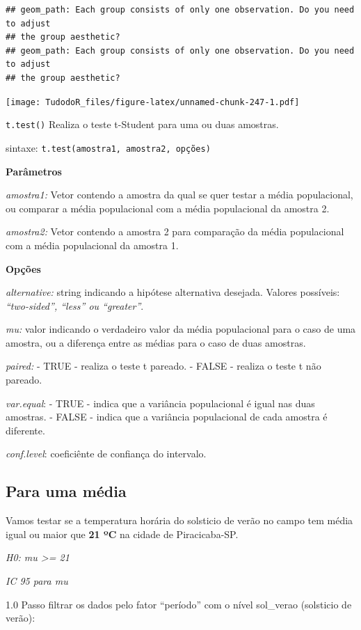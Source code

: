 \documentclass[
]{book}
\begin{document}
\begin{verbatim}
## geom_path: Each group consists of only one observation. Do you need to adjust
## the group aesthetic?
## geom_path: Each group consists of only one observation. Do you need to adjust
## the group aesthetic?
\end{verbatim}

\texttt{[image: TudodoR\_files/figure-latex/unnamed-chunk-247-1.pdf]}

\texttt{t.test()}
Realiza o teste t-Student para uma ou duas amostras.

sintaxe:
\texttt{t.test(amostra1,\ amostra2,\ opções)}

\textbf{Parâmetros}

\emph{amostra1:} Vetor contendo a amostra da qual se quer testar a média populacional, ou comparar a média populacional com a média populacional da amostra 2.

\emph{amostra2:} Vetor contendo a amostra 2 para comparação da média populacional com a média populacional da amostra 1.

\textbf{Opções}

\emph{alternative:} string indicando a hipótese alternativa desejada.
Valores possíveis: \emph{``two-sided'', ``less'' ou ``greater''}.

\emph{mu:} valor indicando o verdadeiro valor da média populacional para o caso de uma amostra, ou a diferença entre as médias para o caso de duas amostras.

\emph{paired:}
- TRUE - realiza o teste t pareado.
- FALSE - realiza o teste t não pareado.

\emph{var.equal}:
- TRUE - indica que a variância populacional é igual nas duas amostras.
- FALSE - indica que a variância populacional de cada amostra é diferente.

\emph{conf.level}: coeficiênte de confiança do intervalo.

\hypertarget{para-uma-muxe9dia}{%
\subsection{Para uma média}\label{para-uma-muxe9dia}}

Vamos testar se a temperatura horária do solsticio de verão no campo tem média igual ou maior que \textbf{21 ºC} na cidade de Piracicaba-SP.

\emph{H0: mu \textgreater= 21}

\emph{IC 95 para mu}

1.0 Passo filtrar os dados pelo fator ``período'' com o nível sol\_verao (solsticio de verão):
\end{document}
